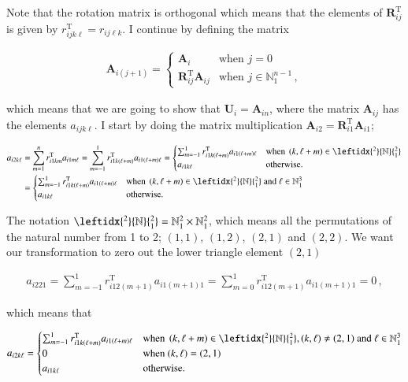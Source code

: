 \documentclass[11pt,english,a4paper]{article}
\begin{document}
\begin{flushleft}
Note that the rotation matrix is orthogonal which means that the elements of $\textbf{R}_{ij}^{\text{T}}$ is given by $r_{ijk\ell}^{\text{T}} = r_{ij\ell k}$. I continue by defining the matrix

\begin{align*}
\textbf{A}_{i(j+1)} = \begin{cases}\textbf{A}_i &\text{when } j=0 \\ \textbf{R}_{ij}^{\text{T}}\textbf{A}_{ij} & \text{when } j\in\mathbb{N}_1^{n-1}\,, \end{cases}
\end{align*}

which means that we are going to show that $\textbf{U}_i = \textbf{A}_{in}$, where the matrix $\textbf{A}_{ij}$ has the elements $a_{ijk\ell}$. I start by doing the matrix multiplication $\textbf{A}_{i2} = \textbf{R}_{i1}^{\text{T}}\textbf{A}_{i1}$;

\begin{align*}
a_{i2k\ell} &= \sum_{m=1}^n r_{i1km}^{\text{T}} a_{i1m\ell} = \sum_{m=-1}^1 r_{i1k(\ell+m)}^{\text{T}} a_{i1(\ell+m)\ell}
= \begin{cases} \sum_{m=-1}^1 r_{i1k(\ell+m)}^{\text{T}} a_{i1(\ell+m)\ell} & \text{when } \p{k,\ell+m}\in{\leftidx{^2}{\mathbb{N}}{_1^2}}\\ a_{i1k\ell} & \text{otherwise.}\end{cases} 
\\
&= \begin{cases} \sum_{m=-1}^1 r_{i1k(\ell+m)}^{\text{T}} a_{i1(\ell+m)\ell} & \text{when } \p{k,\ell+m}\in{\leftidx{^2}{\mathbb{N}}{_1^2}} \text{ and } \ell \in\mathbb{N}_1^3\\ a_{i1k\ell} & \text{otherwise.}\end{cases}
\end{align*}

The notation $\leftidx{^2}{\mathbb{N}}{_1^2} = \mathbb{N}_1^2 \times \mathbb{N}_1^2$, which means all the permutations of the natural number from 1 to 2; $(1,1)$, $(1,2)$, $(2,1)$ and $(2,2)$. We want our transformation to zero out the lower triangle element $(2,1)$

\begin{align*}
a_{i221} = \sum_{m=-1}^1 r_{i12(m+1)}^{\text{T}} a_{i1(m+1)1} = \sum_{m=0}^1 r_{i12(m+1)}^{\text{T}} a_{i1(m+1)1} = 0\,,
\end{align*}

which means that 

\begin{align*}
a_{i2k\ell} = \begin{cases} \sum_{m=-1}^1 r_{i1k(\ell+m)}^{\text{T}} a_{i1(\ell+m)\ell} & \text{when } \p{k,\ell+m}\in{\leftidx{^2}{\mathbb{N}}{_1^2}}, (k,\ell)\neq(2,1) \text{ and } \ell \in\mathbb{N}_1^3\\ 0 & \text{when } (k,\ell)=(2,1) \\ a_{i1k\ell} & \text{otherwise.}\end{cases}
\end{align*}


\end{flushleft}
\end{document}
